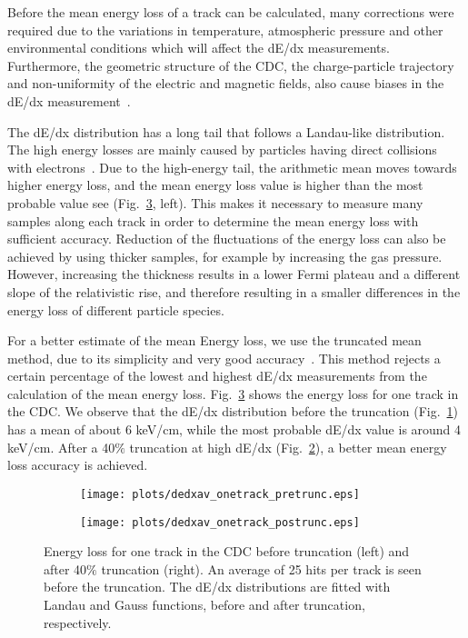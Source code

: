 Before the mean energy loss of a track can be calculated, many corrections were required due to the variations in temperature, atmospheric pressure and other environmental conditions which will affect the dE/dx measurements. Furthermore, the geometric structure of the CDC, the charge-particle trajectory and non-uniformity of the electric and magnetic fields, also cause biases in the dE/dx measurement~\cite{Blum08,Cao10,Hauschild96}.
~\par The dE/dx distribution has a long tail that follows a Landau-like distribution. The high energy losses are mainly caused by particles having direct collisions with electrons~\cite{Leo94}. Due to the high-energy tail, the arithmetic mean moves towards higher energy loss, and the mean energy loss value is higher than the most probable value see (Fig.~\ref{fig.3.3}, left). This makes it necessary to measure many samples along each track in order to determine the mean energy loss with sufficient accuracy. Reduction of the fluctuations of the energy loss can also be achieved by using thicker samples, for example by increasing the gas pressure. However, increasing the thickness results in a lower Fermi plateau and a different slope of the relativistic rise, and therefore resulting in a smaller differences in the energy loss of different particle species.
~\par For a better estimate of the mean Energy loss, we use the truncated mean method, due to its simplicity and very good accuracy~\cite{Blum08,Cao10,Hauschild96}. This method rejects a certain percentage of the lowest and highest dE/dx measurements from the calculation of the mean energy loss. Fig.~\ref{fig.3.3} shows the energy loss for one track in the CDC. We observe that the dE/dx distribution before the truncation (Fig.~\ref{fig.3.3.a}) has a mean of about 6 keV/cm, while the most probable dE/dx value is around 4 keV/cm. After a 40$\%$ truncation at high dE/dx (Fig.~\ref{fig.3.3.b}), a better mean energy loss accuracy is achieved.

\begin{figure}[H]
    \centering
    \begin{subfigure}[b]{0.5\textwidth}
        \texttt{[image: plots/dedxav\_onetrack\_pretrunc.eps]}
        \caption{}
        \label{fig.3.3.a}        
    \end{subfigure}\hfill
    \begin{subfigure}[b]{0.5\textwidth}
        \texttt{[image: plots/dedxav\_onetrack\_postrunc.eps]}
        \caption{}
        \label{fig.3.3.b}        
    \end{subfigure}
    \caption{Energy loss for one track in the CDC before truncation (left) and after 40$\%$ truncation (right). An average of 25 hits per track is seen before the truncation. The dE/dx distributions are fitted with Landau and Gauss functions, before and after truncation, respectively.}
    \label{fig.3.3}
\end{figure}
\vfill


